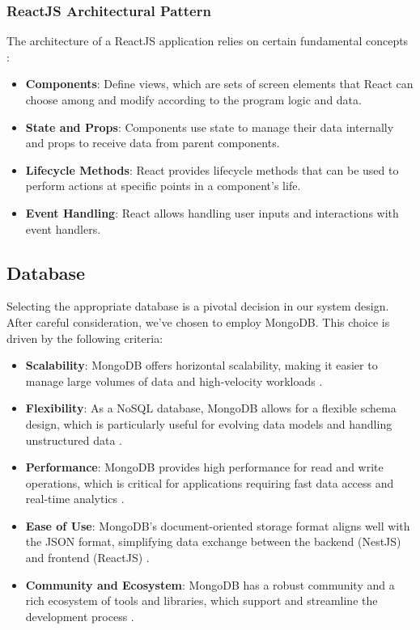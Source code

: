 \subsubsection*{ReactJS Architectural Pattern}
The architecture of a ReactJS application relies on certain fundamental concepts \cite{ReactUpAndRunning}:
\begin{itemize}
    \item \textbf{Components}: Define views, which are sets of screen elements that React can choose among and modify according to the program logic and data.
    \item \textbf{State and Props}: Components use state to manage their data internally and props to receive data from parent components.
    \item \textbf{Lifecycle Methods}: React provides lifecycle methods that can be used to perform actions at specific points in a component's life.
    \item \textbf{Event Handling}: React allows handling user inputs and interactions with event handlers.
\end{itemize}
\subsection{Database}

Selecting the appropriate database is a pivotal decision in our system design. After careful consideration, we’ve chosen to employ MongoDB. This choice is driven by the following criteria:

\begin{itemize}
    \item \textbf{Scalability}: MongoDB offers horizontal scalability, making it easier to manage large volumes of data and high-velocity workloads \cite{MongoDBTheDefinitiveGuide}.
    \item \textbf{Flexibility}: As a NoSQL database, MongoDB allows for a flexible schema design, which is particularly useful for evolving data models and handling unstructured data \cite{LearningNoSQL}.
    \item \textbf{Performance}: MongoDB provides high performance for read and write operations, which is critical for applications requiring fast data access and real-time analytics \cite{MongoDBAppliedDesignPatterns}.
    \item \textbf{Ease of Use}: MongoDB's document-oriented storage format aligns well with the JSON format, simplifying data exchange between the backend (NestJS) and frontend (ReactJS) \cite{MongoDBTheDefinitiveGuide}.
    \item \textbf{Community and Ecosystem}: MongoDB has a robust community and a rich ecosystem of tools and libraries, which support and streamline the development process \cite{LearningNoSQL}.
\end{itemize}

